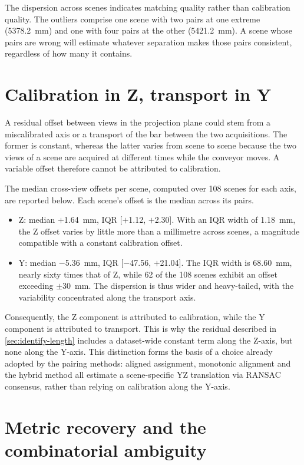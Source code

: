 \documentclass[a4paper, 12pt, twoside]{book}
\begin{document}
The dispersion across scenes indicates matching quality rather than calibration quality. The outliers comprise one scene with two pairs at one extreme (5378.2~mm) and one with four pairs at the other (5421.2~mm). A scene whose pairs are wrong will estimate whatever separation makes those pairs consistent, regardless of how many it contains.
\newpage
\section{Calibration in Z, transport in Y}
\label{sec:identify-ztransport}

A residual offset between views in the projection plane could stem from a miscalibrated axis or a transport of the bar between the two acquisitions. The former is constant, whereas the latter varies from scene to scene because the two views of a scene are acquired at different times while the conveyor moves. A variable offset therefore cannot be attributed to calibration.

The median cross-view offsets per scene, computed over 108 scenes for each axis, are reported below. Each scene's offset is the median across its pairs.

\begin{itemize}
\item Z: median $+$1.64~mm, IQR [$+$1.12, $+$2.30]. With an IQR width of 1.18~mm, the Z offset varies by little more than a millimetre across scenes, a magnitude compatible with a constant calibration offset.
\item Y: median $-$5.36~mm, IQR [$-$47.56, $+$21.04]. The IQR width is 68.60~mm, nearly sixty times that of Z, while 62 of the 108 scenes exhibit an offset exceeding $\pm$30~mm. The dispersion is thus wider and heavy-tailed, with the variability concentrated along the transport axis.
\end{itemize}

Consequently, the Z component is attributed to calibration, while the Y component is attributed to transport. This is why the residual described in \cref{sec:identify-length} includes a dataset-wide constant term along the Z-axis, but none along the Y-axis. This distinction forms the basis of a choice already adopted by the pairing methods: aligned assignment, monotonic alignment and the hybrid method all estimate a scene-specific YZ translation via RANSAC consensus, rather than relying on calibration along the Y-axis.

\section{Metric recovery and the combinatorial ambiguity}
\label{sec:identify-metric}
\end{document}
